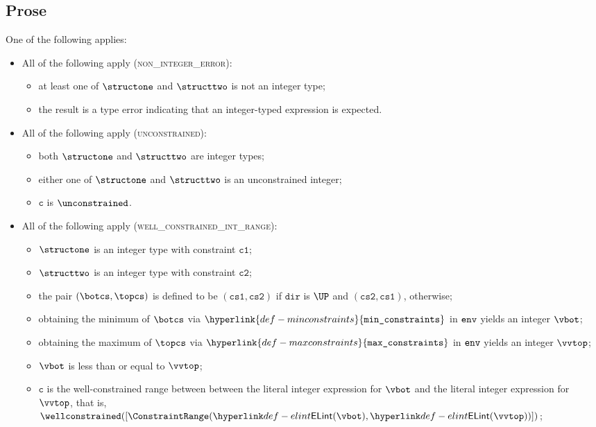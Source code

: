 \documentclass{book}
\newcommand\minconstraints[0]{\hyperlink{def-minconstraints}{\texttt{min\_constraints}}}
\newcommand\maxconstraints[0]{\hyperlink{def-maxconstraints}{\texttt{max\_constraints}}}
\newcommand\vc[0]{\texttt{c}}
\newcommand\vcone[0]{\texttt{c1}}
\newcommand\vctwo[0]{\texttt{c2}}
\newcommand\dir[0]{\texttt{dir}}
\newcommand\csone[0]{\texttt{cs1}}
\newcommand\cstwo[0]{\texttt{cs2}}
\begin{document}
\subsection{Prose}
One of the following applies:
\begin{itemize}
  \item All of the following apply (\textsc{non\_integer\_error}):
  \begin{itemize}
    \item at least one of $\structone$ and $\structtwo$ is not an integer type;
    \item the result is a type error indicating that an integer-typed expression is expected.
  \end{itemize}

  \item All of the following apply (\textsc{unconstrained}):
  \begin{itemize}
    \item both $\structone$ and $\structtwo$ are integer types;
    \item either one of $\structone$ and $\structtwo$ is an unconstrained integer;
    \item $\vc$ is $\unconstrained$.
  \end{itemize}

  \item All of the following apply (\textsc{well\_constrained\_int\_range}):
  \begin{itemize}
    \item $\structone$ is an integer type with constraint $\vcone$;
    \item $\structtwo$ is an integer type with constraint $\vctwo$;
    \item the pair $(\botcs, \topcs)$ is defined to be $(\csone, \cstwo)$ if $\dir$ is $\UP$ and $(\cstwo, \csone)$, otherwise;
    \item obtaining the minimum of $\botcs$ via $\minconstraints$ in $\texttt{env}$ yields an integer $\vbot$;
    \item obtaining the maximum of $\topcs$ via $\maxconstraints$ in $\texttt{env}$ yields an integer $\vvtop$;
    \item $\vbot$ is less than or equal to $\vvtop$;
    \item $\vc$ is the well-constrained range between between the literal integer expression for $\vbot$ and
          the literal integer expression for $\vvtop$, that is, \\
          $\wellconstrained([\ConstraintRange(\ELInt{\vbot}, \ELInt{\vvtop})])$;
  \end{itemize}


\end{itemize}
\end{document}
